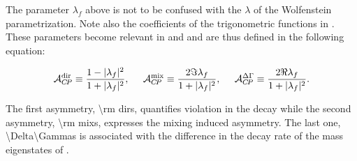 \noindent
\noindent The parameter $\lambda_f$ above is not to be confused with the $\lambda$ of the
Wolfenstein parametrization. Note also the coefficients of the trigonometric functions in
. These parameters become relevant in 
and  and are thus defined in the following equation:

\begin{equation}
  \centering
  \Acp{\rm dir}      \equiv \frac{ 1-|\lambda_f|^2} {1 + |\lambda_f|^2},\;\;\;\;\;
  \Acp{\rm mix}      \equiv \frac{ 2 \Im\lambda_f} {1 + |\lambda_f|^2},\;\;\;\;\;
  \Acp{\Delta\Gamma} \equiv \frac{ 2 \Re\lambda_f} {1 + |\lambda_f|^2}.
\label{cp_asym_lambda}
\end{equation}

\noindent The first asymmetry, \Acp{\rm dir}, quantifies \CP violation in the decay while the
second asymmetry, \Acp{\rm mix}, expresses the mixing induced \CP asymmetry. The last one,
\Acp{\Delta\Gamma} is associated with the difference in the decay rate of the mass eigenstates of .
